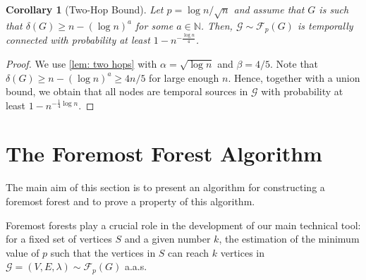\documentclass[a4paper,11pt]{article}
\makeatletter
\theoremstyle{definition}
\theoremstyle{plain}
\newtheorem{corollary}{Corollary}
\newcommand{\NN}{\ensuremath{\mathbb{N}}}
\newcommand{\FFF}{\mathcal{F}}
\newcommand{\GGG}{\mathcal{G}}
\newcommand{\G}{\mathcal G}
\newcommand{\F}{\mathcal F}
\newcommand{\aas}{a.a.s.\@\xspace}
\makeatother
\begin{document}
\begin{corollary}[Two-Hop Bound]\label{cor: two hop}
	Let $p=\log n/\sqrt{n}$ and assume that $G$ is such that $\delta(G)\ge n - (\log n)^a$ for some $a\in\NN$. Then, $\GGG\sim \FFF_p(G)$ is temporally connected with probability at least $1-n^{-\frac{\log n}{4}}$.
\end{corollary}
\begin{proof}
	We use \cref{lem: two hops} with $\alpha=\sqrt{\log n}$ and $\beta=4/5$. Note that $\delta(G)\ge n - (\log n)^a \ge 4n/5$ for large enough $n$. Hence, together with a union bound, we obtain that all nodes are temporal sources in $\GGG$ with probability at least
	$
		1 - n^{-\frac{1}{4} \log n}
	$.
\end{proof}


\section{The Foremost Forest Algorithm}
\label{sec: foremost forest algorithm}

The main aim of this section is to present an algorithm for constructing a foremost forest and to prove a property of this algorithm.

Foremost forests play a crucial role in the development of our main technical tool: for a fixed set of vertices $S$ and a given number $k$,
the estimation of the minimum value of $p$ such that the vertices in $S$ can reach $k$ vertices in $\G = (V, E, \lambda) \sim  \F_p(G)$ \aas
\end{document}
